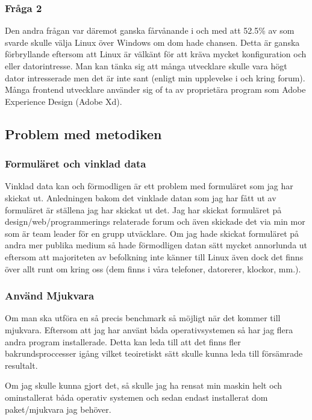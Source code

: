 \documentclass[12pt, a4paper]{report}
\begin{document}
\subsubsection{Fråga 2}
Den andra frågan var däremot ganska fårvånande i och med att 52.5\% av som svarde skulle välja Linux över Windows om dom hade chansen. Detta är ganska förbryllande eftersom att Linux är välkänt för att kräva mycket konfiguration och eller datorintresse. Man kan tänka sig att många utvecklare skulle vara högt dator intresserade men det är inte sant (enligt min upplevelse i och kring forum). Många frontend utvecklare använder sig of ta av proprietära program som Adobe Experience Design (Adobe Xd). 

\subsection{Problem med metodiken}

\subsubsection{Formuläret och vinklad data}

Vinklad data kan och förmodligen är ett problem med formuläret som jag har skickat ut. Anledningen bakom det vinklade datan som jag har fått ut av formuläret är ställena jag har skickat ut det. Jag har skickat formuläret på design/web/programmerings relaterade forum och även skickade det via min mor som är team leader för en grupp utväcklare. Om jag hade skickat formuläret på andra mer publika medium så hade förmodligen datan sätt mycket annorlunda ut eftersom att majoriteten av befolkning inte känner till Linux även dock det finns över allt runt om kring oss (dem finns i våra telefoner, datorerer, klockor, mm.). 

\subsubsection{Använd Mjukvara}

Om man ska utföra en så precis benchmark så möjligt när det kommer till mjukvara. Eftersom att jag har använt båda operativsystemen så har jag flera andra program installerade. Detta kan leda till att det finns fler bakrundsproccesser igång vilket teoiretiskt sätt skulle kunna leda till försämrade resultalt.

Om jag skulle kunna gjort det, så skulle jag ha rensat min maskin helt och ominstallerat båda operativ systemen och sedan endast installerat dom paket/mjukvara jag behöver.
\end{document}
